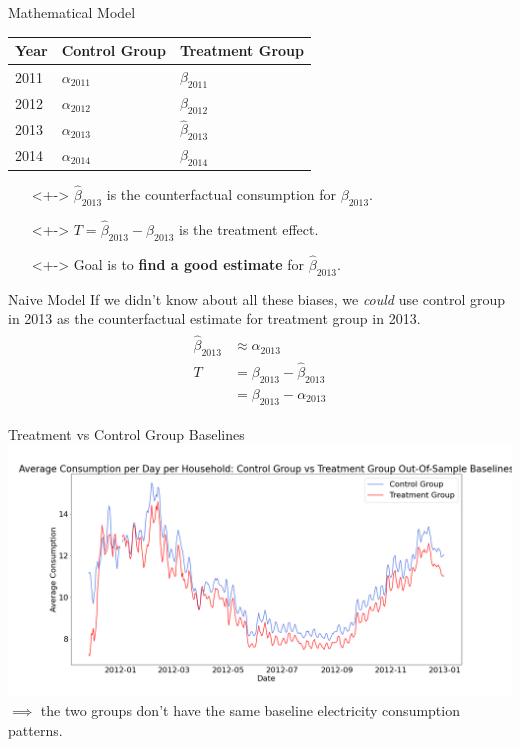 \documentclass{beamer}
\begin{document}
\begin{frame}{Mathematical Model}
  \begin{table}[h!]
  \centering
    \begin{tabular}{|p{3cm}|p{3.5cm}|p{3.5cm}|}
        \hline
        Year & Control Group & Treatment Group \\
        \hline
        2011 & $\alpha_{2011}$ & $\beta_{2011}$ \\
        2012 & $\alpha_{2012}$ & $\beta_{2012}$ \\
        2013 & $\alpha_{2013}$ & $\hat\beta_{2013}$ \\
        2014 & $\alpha_{2014}$ & $\beta_{2014}$ \\
        \hline
    \end{tabular}
  \end{table}
  \begin{itemize}
    \item[]<+-> $\hat\beta_{2013}$ is the counterfactual consumption for $\beta_{2013}$.
    \item[]<+-> $T = \hat\beta_{2013} - \beta_{2013}$ is the treatment effect.
    \item[]<+-> Goal is to \textbf{find a good estimate} for $\hat\beta_{2013}$.
  \end{itemize}
\end{frame}

\begin{frame}{Naive Model}
  If we didn't know about all these biases, we \textit{could} use control group in 2013 as the counterfactual estimate for treatment group in 2013.
  \begin{align}
    \begin{split}
      \hat\beta_{2013} & \approx \alpha_{2013} \\
      T & = \beta_{2013} - \hat\beta_{2013} \\
        & = \beta_{2013} - \alpha_{2013}
    \end{split}
  \end{align}
\end{frame}

\begin{frame}{Treatment vs Control Group Baselines}
  \centering
  \includegraphics[width=1\textwidth]{images/avg-consumption-per-day-baseline.png}
  $\implies$ the two groups don't have the same baseline electricity consumption patterns.
\end{frame}
\end{document}
